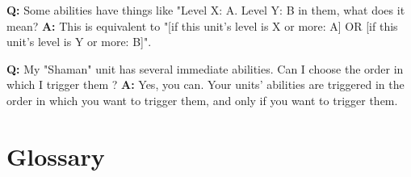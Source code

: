\documentclass[a4paper]{article}
\begin{document}
    \hspace{-2em}
    \textbf{Q:} Some abilities have things like "Level X: A. Level Y: B in them,
     what does it mean?
    \newline
    \textbf{A:} This is equivalent to "[if this unit's level is X or more: A]
     OR [if this unit's level is Y or more: B]".
    
    \hspace{-2em}
    \textbf{Q:} My "Shaman" unit has several immediate abilities.
    Can I choose the order in which I trigger them ?
    \newline
    \textbf{A:} Yes, you can. Your units' abilities are triggered in the order in which
    you want to trigger them, and only if you want to trigger them.
    
    
\newpage
\section{Glossary}
  
\end{document}
